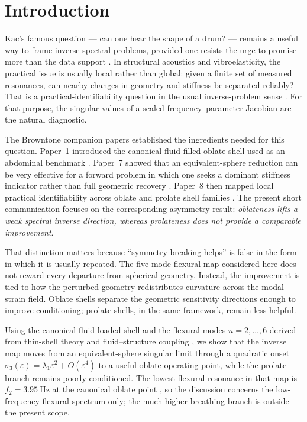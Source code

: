 \section{Introduction}

Kac's famous question --- can one hear the shape of a drum? --- remains a
useful way to frame inverse spectral problems, provided one resists the urge to
promise more than the data support \cite{Kac1966}.  In structural acoustics and
vibroelasticity, the practical issue is usually local rather than global: given
a finite set of measured resonances, can nearby changes in geometry and
stiffness be separated reliably?  That is a practical-identifiability question
in the usual inverse-problem sense \cite{Raue2009,Wieland2021}.  For that
purpose, the singular values of a scaled frequency--parameter Jacobian are the
natural diagnostic.

The Browntone companion papers established the ingredients needed for this
question.  Paper~1 introduced the canonical fluid-filled oblate shell used as
an abdominal benchmark \cite{BrowntoneP1}.  Paper~7 showed that an
equivalent-sphere reduction can be very effective for a forward problem in
which one seeks a dominant stiffness indicator rather than full geometric
recovery \cite{BrowntoneP7}.  Paper~8 then mapped local practical
identifiability across oblate and prolate shell families \cite{BrowntoneP8}.
The present short communication focuses on the corresponding asymmetry result:
\emph{oblateness lifts a weak spectral inverse direction, whereas prolateness
does not provide a comparable improvement}.

That distinction matters because ``symmetry breaking helps'' is false in the
form in which it is usually repeated.  The five-mode flexural map considered
here does not reward every departure from spherical geometry.  Instead, the
improvement is tied to how the perturbed geometry redistributes curvature across
the modal strain field.  Oblate shells separate the geometric sensitivity
directions enough to improve conditioning; prolate shells, in the same
framework, remain less helpful.

Using the canonical fluid-loaded shell and the flexural modes $n=2,\ldots,6$
derived from thin-shell theory and fluid--structure coupling
\cite{Lamb1882,JungerFeit1986}, we show that the inverse map moves from an
equivalent-sphere singular limit through a quadratic onset
$\sigma_3(\varepsilon)=\lambda_1\varepsilon^2+O(\varepsilon^4)$ to a useful
oblate operating point, while the prolate branch remains poorly conditioned.  The lowest flexural resonance in that map is
$f_2=\SI{3.95}{\hertz}$ at the canonical oblate point \cite{BrowntoneP1}, so
the discussion concerns the low-frequency flexural spectrum only; the much
higher breathing branch is outside the present scope.

